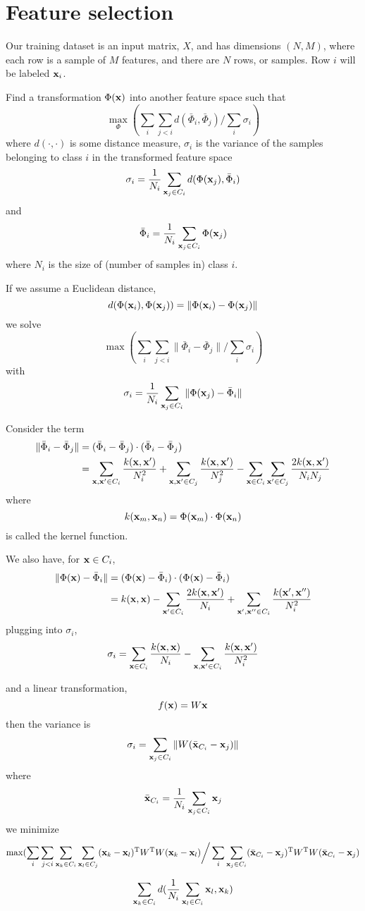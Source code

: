 \documentclass{article}
\newcommand{\bx}{{\bf x}}
\newcommand{\bxp}{\bx^{\prime}}
\newcommand{\bxpp}{\bx^{\prime \prime}}
\begin{document}
\section*{Feature selection}

Our training dataset is an input matrix, $X$, and
has dimensions $(N, M)$, where each row is a
sample of $M$ features, and there are $N$ rows, or samples. Row $i$
will be labeled $\bx_i$.

Find a transformation $\Phi(\bx)$ into another feature space
such that
\[
\max_{\Phi} ( \sum_i \sum_{j < i} d(\bar{\Phi}_i, \bar{\Phi}_j)
\bigg / \sum_i \sigma_i )
\]
where $d(\cdot, \cdot)$ is some distance measure, $\sigma_i$ is the variance of
the samples belonging to class $i$
in the transformed feature space
\[
\sigma_i = \frac{1}{N_i} \sum_{\bx_j \in C_i} d( \Phi(\bx_j), \bar{\Phi}_i )
\]
and
\[
\bar{\Phi}_i = \frac{1}{N_i} \sum_{\bx_j \in C_i} \Phi(\bx_j)
\]
where $N_i$ is the size of (number of samples in) class $i$.


If we assume a Euclidean distance,
\[
d(\Phi(\bx_i), \Phi(\bx_j)) = \| \Phi(\bx_i) - \Phi(\bx_j) \|
\]
we solve
\[
\max ( \sum_i \sum_{j < i} \| \bar{\Phi}_i - \bar{\Phi}_j \|
\bigg / \sum_i \sigma_i )
\]
with
\[
\sigma_i = \frac{1}{N_i} \sum_{\bx_j \in C_i} \| \Phi(\bx_j) - \bar{\Phi}_i \|
\]

Consider the term
\begin{align*}
\| \bar{\Phi}_i - \bar{\Phi}_j \| &= 
(\bar{\Phi}_i - \bar{\Phi}_j) \cdot (\bar{\Phi}_i - \bar{\Phi}_j) \\
&= \sum_{\bx, \bxp \in C_i} \frac{k(\bx, \bxp)}{N_i^2} +
   \sum_{\bx, \bxp \in C_j} \frac{k(\bx, \bxp)}{N_j^2} -
   \sum_{\bx \in C_i} \sum_{\bxp \in C_j} \frac{2 k(\bx, \bxp)}{N_i N_j}
\end{align*}
where
\[
k(\bx_m, \bx_n) = \Phi(\bx_m) \cdot \Phi(\bx_n)
\]
is called the kernel function.

We also have, for $\bx \in C_i$,
\begin{align*}
\| \Phi(\bx) - \bar{\Phi}_i \| &= 
(\Phi(\bx) - \bar{\Phi}_i) \cdot (\Phi(\bx) - \bar{\Phi}_i) \\
&= k(\bx, \bx) -
   \sum_{\bxp \in C_i} \frac{2 k(\bx, \bxp)}{N_i} +
   \sum_{\bxp, \bxpp \in C_i} \frac{k(\bxp, \bxpp)}{N_i^2}
\end{align*}
plugging into $\sigma_i$,
\[
\sigma_i =
   \sum_{\bx \in C_i} \frac{k(\bx, \bx)}{N_i} -
   \sum_{\bx, \bxp \in C_i} \frac{k(\bx, \bxp)}{N_i^2}
\]


and a linear transformation,
\[
f(\bx) = W \bx
\]
then the variance is
\[
\sigma_i = \sum_{\bx_j \in C_i} \| W ( \bar{\bx}_{C_i} - \bx_j ) \|
\]
where
\[
\bar{\bx}_{C_i} = \frac{1}{N_i} \sum_{\bx_j \in C_i} \bx_j
\]
we minimize
\[
\max ( \sum_i \sum_{j < i} \sum_{\bx_k \in C_i} \sum_{\bx_l \in C_j}
(\bx_k - \bx_l)^{\rm T} W^{\rm T} W (\bx_k - \bx_l)
\bigg / \sum_i \sum_{\bx_j \in C_i}
(\bar{\bx}_{C_i} - \bx_j)^{\rm T} W^{\rm T} W (\bar{\bx}_{C_i} - \bx_j)
\]

\[
\sum_{\bx_k \in C_i} d(\frac{1}{N_i} \sum_{\bx_l \in C_i} \bx_l, \bx_k)
\]
\end{document}
